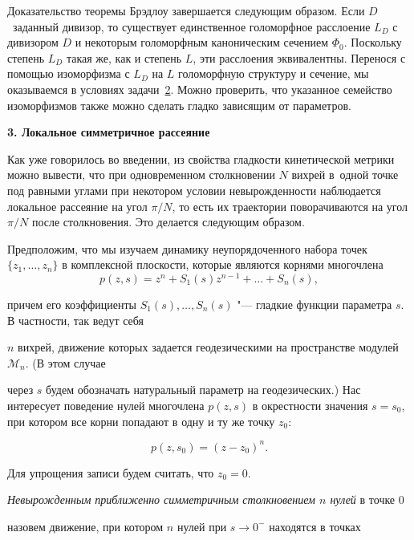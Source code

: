  Доказательство теоремы Брэдлоу завершается следующим образом. Если $D$~заданный дивизор, то существует единственное голоморфное расслоение $L_D$ с дивизором $D$ и некоторым голоморфным каноническим сечением $\Phi_0$. Поскольку степень $L_D$ такая же, как и степень $L$,  эти расслоения эквивалентны. Перенося с помощью изоморфизма с $L_D$ на $L$ голоморфную структуру и сечение,  мы оказываемся в условиях задачи~\hyperlink{plv:2}{2}. Можно проверить, что указанное семейство изоморфизмов также можно сделать гладко зависящим от параметров.



\smallskip



\hypertarget{localscattering}{}



\textbf{3. Локальное симметричное рассеяние}



Как уже говорилось во введении, из свойства гладкости кинетической метрики можно вывести, что при одновременном столкновении $N$ вихрей в~одной точке под равными углами при некотором условии невырожденности наблюдается локальное рассеяние на угол $\pi/N$, то есть их траектории поворачиваются на угол $\pi/N$ после столкновения. Это делается следующим образом.



Предположим, что мы изучаем динамику неупорядоченного набора точек $\{z_1,\dots,z_n\}$ в комплексной плоскости, которые являются корнями многочлена $$p(z,s)=z^n+S_1(s)z^{n-1}+\dots+S_n(s),$$ 

причем его коэффициенты $S_1(s),\dots,S_n(s)$ "---  гладкие функции параметра $s$. В частности, так ведут себя

$n$ вихрей, движение которых задается геодезическими на пространстве модулей $\mathcal M_n$. (В этом случае 

через $s$ будем обозначать натуральный параметр на геодезических.) Нас интересует поведение нулей многочлена $p(z,s)$ в окрестности значения $s=s_0$, при котором все корни попадают в одну и ту же точку $z_0$:

$$

p(z,s_0)=(z-z_0)^n.

$$

Для упрощения записи будем считать, что $z_0=0$.

\textit{Невырожденным приближенно симметричным столкновением $n$ нулей} в точке $0$

назовем движение, при котором $n$ нулей при $s\to 0^-$ находятся в точках

